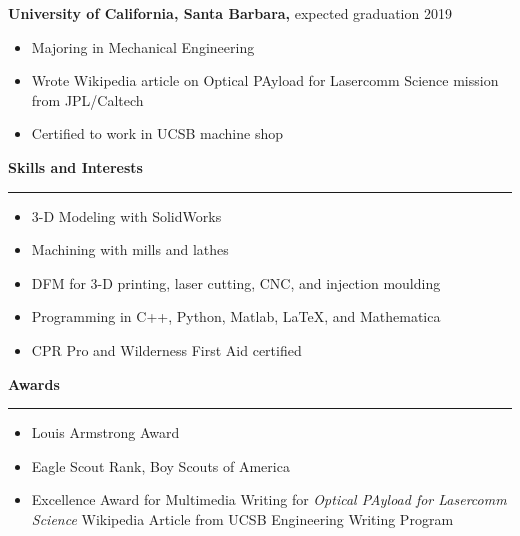 \documentclass[12pt, oneside]{article}
\newcommand{\headingstyleSJobs}[1] {
	{\fontsize{20pt}{1em}\selectfont \bf \textcolor{new_red}{#1}}
	\textcolor{new_red}{\rule{3.25in}{0.5pt}} \vspace{-10pt}
}
\newcommand{\jobtitle}[2] {
	{\bf #1} {#2} \vspace{-10pt} \\
}
\begin{document}
\begin{flushleft}
\jobtitle{University of California, Santa Barbara,}{expected graduation 2019}
\begin{itemize}
	\item Majoring in Mechanical Engineering
	\item Wrote Wikipedia article on Optical PAyload for Lasercomm Science mission from JPL/Caltech \\
	\item Certified to work in UCSB machine shop
\end{itemize}


\headingstyleSJobs{Skills and Interests}

\begin{itemize}
	\item 3-D Modeling with SolidWorks \\
	\item Machining with mills and lathes \\
	\item DFM for 3-D printing, laser cutting, CNC, and injection moulding \\
	\item Programming in C++, Python, Matlab, \LaTeX, and Mathematica \\
	\item CPR Pro and Wilderness First Aid certified \\ %
\end{itemize}


\headingstyleSJobs{Awards}

\begin{itemize}
	\item Louis Armstrong Award
	\item Eagle Scout Rank, Boy Scouts of America
	\item Excellence Award for Multimedia Writing for \textit{Optical PAyload for Lasercomm Science} Wikipedia Article from UCSB Engineering Writing Program
\end{itemize}

\end{flushleft}
\end{document}
